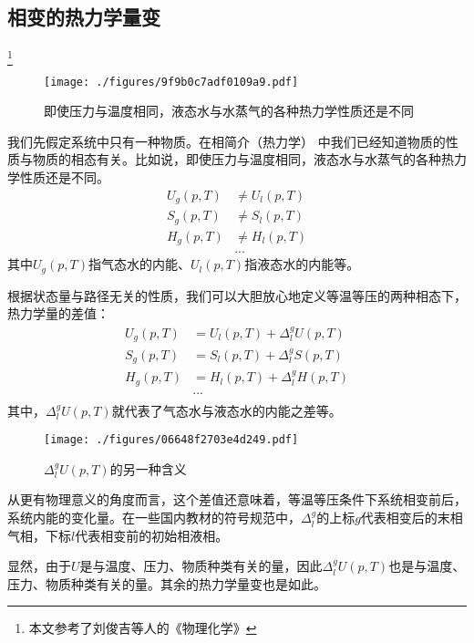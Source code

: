 
\begin{issues}
\issueDraft
\end{issues}

\subsection{相变的热力学量变}
\footnote{本文参考了刘俊吉等人的《物理化学》}
\begin{figure}[ht]
\centering
\texttt{[image: ./figures/9f9b0c7adf0109a9.pdf]}
\caption{即使压力与温度相同，液态水与水蒸气的各种热力学性质还是不同} \label{fig_PTTVC2_1}
\end{figure}

我们先假定系统中只有一种物质。在相简介（热力学） 中我们已经知道物质的性质与物质的相态有关。比如说，即使压力与温度相同，液态水与水蒸气的各种热力学性质还是不同。
$$
\begin{aligned}
U_g(p,T) &\ne U_l(p,T)\\
S_g(p,T) &\ne S_l(p,T)\\
H_g(p,T) &\ne H_l(p,T)\\
&...
\end{aligned}
$$
其中$U_g(p,T)$指气态水的内能、$U_l(p,T)$指液态水的内能等。

根据状态量与路径无关的性质，我们可以大胆放心地定义等温等压的两种相态下，热力学量的差值：
$$
\begin{aligned}
U_g(p,T) &= U_l(p,T) + \Delta ^ g_l U (p,T)\\
S_g(p,T) &= S_l(p,T) + \Delta ^ g_l S (p,T)\\
H_g(p,T) &= H_l(p,T) + \Delta ^ g_l H (p,T)\\
&...\\
\end{aligned}
$$
其中，$\Delta ^ g_l U (p,T)$就代表了气态水与液态水的内能之差等。
\begin{figure}[ht]
\centering
\texttt{[image: ./figures/06648f2703e4d249.pdf]}
\caption{$\Delta ^ g_l U (p,T)$的另一种含义} \label{fig_PTTVC2_2}
\end{figure}
从更有物理意义的角度而言，这个差值还意味着，等温等压条件下系统相变前后，系统内能的变化量。在一些国内教材的符号规范中，$\Delta^g_l$的上标$g$代表相变后的末相气相，下标$l$代表相变前的初始相液相。

显然，由于$U$是与温度、压力、物质种类有关的量，因此$\Delta ^ g_l U (p,T)$也是与温度、压力、物质种类有关的量。其余的热力学量变也是如此。

